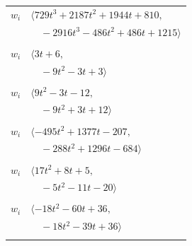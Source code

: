 \documentclass[11pt]{article}
\begin{document}
\begin{longtable}{@{}ll@{}}
$w_i$ & $\langle 729t^{3}+2187t^{2}+1944t+810,$\\
 & $\quad -2916t^{3}-486t^{2}+486t+1215\rangle$\\
\addlinespace[2pt]
\multicolumn{2}{@{}p{0.97\textwidth}@{}}{$i=7$, $D_i=3$, $\rho_{ij}$: $5{:}1, \allowbreak 43{:}1, \allowbreak 46{:}1, \allowbreak 48{:}2, \allowbreak 54{:}2, \allowbreak 63{:}2$}\\
$w_i$ & $\langle 3t+6,$\\
 & $\quad -9t^{2}-3t+3\rangle$\\
\addlinespace[2pt]
\multicolumn{2}{@{}p{0.97\textwidth}@{}}{$i=8$, $D_i=3$, $\rho_{ij}$: $1{:}1, \allowbreak 20{:}1, \allowbreak 40{:}1, \allowbreak 43{:}2, \allowbreak 48{:}1, \allowbreak 52{:}1, \allowbreak 58{:}2, \allowbreak 59{:}1$}\\
$w_i$ & $\langle 9t^{2}-3t-12,$\\
 & $\quad -9t^{2}+3t+12\rangle$\\
\addlinespace[2pt]
\multicolumn{2}{@{}p{0.97\textwidth}@{}}{$i=9$, $D_i=36$, $\rho_{ij}$: $0{:}2, \allowbreak 1{:}1, \allowbreak 20{:}2, \allowbreak 25{:}2, \allowbreak 33{:}1, \allowbreak 38{:}2, \allowbreak 46{:}1, \allowbreak 50{:}2, \allowbreak 52{:}2, \allowbreak 54{:}1, \allowbreak 58{:}2, \allowbreak 63{:}2, \allowbreak 64{:}2, \allowbreak 65{:}2$}\\
$w_i$ & $\langle -495t^{2}+1377t-207,$\\
 & $\quad -288t^{2}+1296t-684\rangle$\\
\addlinespace[2pt]
\multicolumn{2}{@{}p{0.97\textwidth}@{}}{$i=10$, $D_i=1$, $\rho_{ij}$: $4{:}2, \allowbreak 6{:}2, \allowbreak 34{:}1, \allowbreak 50{:}1, \allowbreak 51{:}1, \allowbreak 61{:}2$}\\
$w_i$ & $\langle 17t^{2}+8t+5,$\\
 & $\quad -5t^{2}-11t-20\rangle$\\
\addlinespace[2pt]
\multicolumn{2}{@{}p{0.97\textwidth}@{}}{$i=11$, $D_i=6$, $\rho_{ij}$: $18{:}2, \allowbreak 25{:}1, \allowbreak 32{:}1, \allowbreak 35{:}2, \allowbreak 38{:}2, \allowbreak 49{:}2, \allowbreak 50{:}1, \allowbreak 52{:}1$}\\
$w_i$ & $\langle -18t^{2}-60t+36,$\\
 & $\quad -18t^{2}-39t+36\rangle$\\
\addlinespace[2pt]
\multicolumn{2}{@{}p{0.97\textwidth}@{}}{$i=12$, $D_i=36$, $\rho_{ij}$: $4{:}1, \allowbreak 22{:}1, \allowbreak 27{:}1, \allowbreak 36{:}2, \allowbreak 37{:}1, \allowbreak 51{:}2, \allowbreak 52{:}2, \allowbreak 53{:}1, \allowbreak 54{:}1, \allowbreak 58{:}2, \allowbreak 72{:}1$}\\

\end{longtable}
\end{document}
